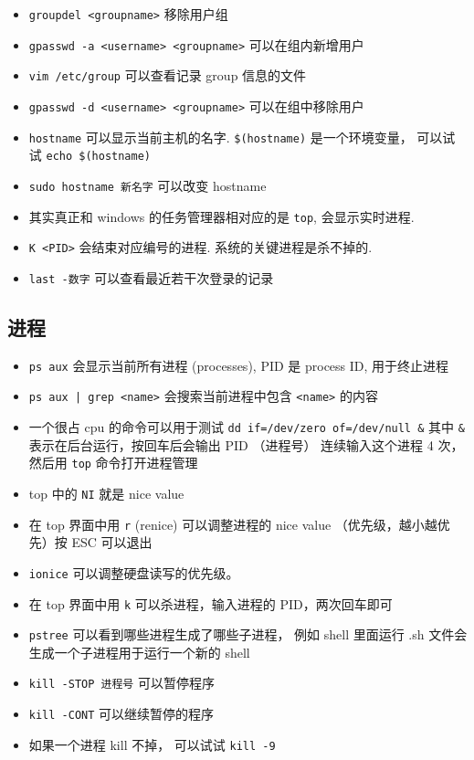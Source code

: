 \begin{itemize}
\item \verb`groupdel <groupname>` 移除用户组
\item \verb`gpasswd -a <username> <groupname>` 可以在组内新增用户
\item \verb`vim /etc/group` 可以查看记录 group 信息的文件
\item \verb`gpasswd -d <username> <groupname>` 可以在组中移除用户
\item \verb`hostname` 可以显示当前主机的名字. \verb`$(hostname)` 是一个环境变量， 可以试试 \verb`echo $(hostname)`
\item \verb|sudo hostname 新名字| 可以改变 hostname
\item 其实真正和 windows 的任务管理器相对应的是 \verb`top`, 会显示实时进程. 
\item \verb`K <PID>` 会结束对应编号的进程. 系统的关键进程是杀不掉的.
\item \verb`last -数字` 可以查看最近若干次登录的记录
\end{itemize}

\subsection{进程}
\begin{itemize}
\item \verb`ps aux` 会显示当前所有进程 (processes), PID 是 process ID, 用于终止进程
\item \verb`ps aux | grep <name>` 会搜索当前进程中包含 \verb`<name>` 的内容
\item 一个很占 cpu 的命令可以用于测试
\verb`dd if=/dev/zero of=/dev/null &`
其中 \verb`&` 表示在后台运行，按回车后会输出 PID （进程号）
连续输入这个进程 4 次， 然后用 \verb`top` 命令打开进程管理
\item top 中的 \verb`NI` 就是 nice value
\item 在 top 界面中用 \verb`r` (renice) 可以调整进程的 nice value （优先级，越小越优先）按 ESC 可以退出
\item \verb|ionice| 可以调整硬盘读写的优先级。
\item 在 top 界面中用 \verb`k` 可以杀进程，输入进程的 PID，两次回车即可
\item \verb`pstree` 可以看到哪些进程生成了哪些子进程， 例如 shell 里面运行 .sh 文件会生成一个子进程用于运行一个新的 shell
\item \verb`kill -STOP 进程号` 可以暂停程序
\item \verb`kill -CONT` 可以继续暂停的程序
\item 如果一个进程 kill 不掉， 可以试试 \verb|kill -9|
\end{itemize}

